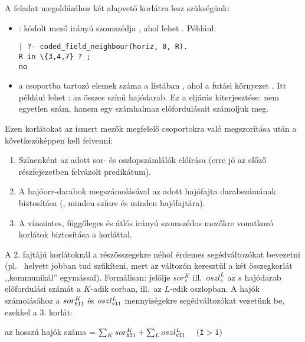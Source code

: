 A feladat megoldásához két alapvető korlátra lesz szükségünk:

\begin{itemize}
\item {}:  kódolt mező
 irányú szomszédja , ahol  lehet . Például:

\begin{verbatim}
| ?- coded_field_neighbour(horiz, 0, R).
R in \{3,4,7} ? ;
no
\end{verbatim}

\item {} a  csoportba
tartozó elemek száma a  listában , ahol a futási
környezet . Itt  például lehet : az összes
 színű hajódarab. Ez a  eljárás kiterjesztése: nem
egyetlen szám, hanem egy számhalmaz előfordulásait számoljuk meg.
\end{itemize}

Ezen korlátokat az ismert mezők megfelelő csoportokra való megszorítása
után a következőképpen kell felvenni:

\begin{enumerate}
\item Színenként az adott sor- és oszlopszámlálók előírása (erre jó az
előző részfejezetben felvázolt  predikátum).
\item A hajóorr-darabok megszámolásával az adott hajófajta darabszámának
biztosítása (, minden színre és minden hajófajtára).
\item A vízszintes, függőleges és átlós irányú szomszédos mezőkre vonatkozó
korlátok biztosítása a  korláttal.
\end{enumerate}

A 2. fajtájú korlátoknál a részösszegekre néhol érdemes segédváltozókat
bevezetni (pl.\  helyett  jobban tud szűkíteni, mert az  változón keresztül a
két összegkorlát ,,kommunikál'' egymással). Formálisan: jelölje $sor^K_s$
ill.\ $oszl^L_s$ az $s$ hajódarab előfordulási számát a $K$-adik sorban,
ill.\ az $L$-edik oszlopban. A hajók számolásához a $sor^K_{\tt hI1}$ és
$oszl^L_{\tt vI1}$ mennyiségekre segédváltozókat vezetünk be, ezekkel a 3. korlát:

\begin{center}
az  hosszú hajók száma =
$\sum_{K} sor^K_{\tt hI1} + \sum_{L} oszl^L_{\tt vI1} \ \ \ \ ({\tt I} > 1)$
\end{center}

